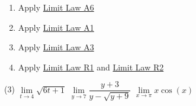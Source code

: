 \documentclass[10pt,oneside,]{book}
\theoremstyle{plain}
\theoremstyle{definition}
\numberwithin{equation}{section}
\begin{document}
\begin{enumerate}[label=(\alph*)]
\item{}Apply \hyperref[lla6]{Limit Law A6}%
\item{}Apply \hyperref[lla1]{Limit Law A1}%
\item{}Apply \hyperref[lla3]{Limit Law A3}%
\item{}Apply \hyperref[llr1]{Limit Law R1} and \hyperref[llr2]{Limit Law R2}%
\end{enumerate}
\par
\begin{exercisegroup}(3)
\exercise[4.]\hypertarget{exercise-first-apply-limit-laws}{\null}\(\lim\limits_{t\to4}\sqrt{6t+1}\)%
\exercise[5.]\hypertarget{exercise-70}{\null}\(\lim\limits_{y\to7}\dfrac{y+3}{y-\sqrt{y+9}}\)%
\exercise[6.]\hypertarget{exercise-71}{\null}\(\lim\limits_{x\to\pi}x\cos(x)\)%
\end{exercisegroup}
\par\smallskip\noindent
\typeout{************************************************}
\typeout{************************************************}
\end{document}
